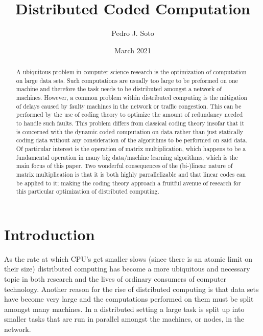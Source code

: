 \documentclass{report}
\title{Distributed Coded Computation}
\author{Pedro J. Soto}
\date{March 2021}
\begin{document}
\maketitle


\tableofcontents

\begin{abstract}
A ubiquitous problem in computer science research is the optimization of computation on large data sets. Such computations are usually too large to be preformed on one machine and therefore the task needs to be distributed amongst a network of machines. However, a common problem within distributed computing is the mitigation of delays caused by faulty machines in the network or traffic congestion. This can be performed by the use of coding theory to optimize the amount of redundancy needed to handle such faults.  This problem differs from classical coding theory insofar that it is concerned with the dynamic coded computation on data rather than just statically coding data without any consideration of the algorithms to be performed on said data. Of particular interest is the operation of matrix multiplication, which happens to be a fundamental operation in many big data/machine learning algorithms, which is the main focus of this paper. Two wonderful consequences of the (bi-)linear nature of matrix multiplication is that it is both highly parrallelizable and that linear codes can be applied to it; making the coding theory approach a fruitful avenue of research for this particular optimization of distributed computing. 
\end{abstract}

\section{Introduction}

As the rate at which CPU's get smaller slows (since there is an atomic limit on their size) distributed computing has become a more ubiquitous and necessary topic in both research and the lives of ordinary consumers of computer technology. 
Another reason for the rise of distributed computing is that data sets have become very large and the computations performed on them must be split amongst many machines. 
In a distributed setting a large task is split up into smaller tasks that are run in parallel amongst the machines, or nodes, in the network. 
\end{document}
